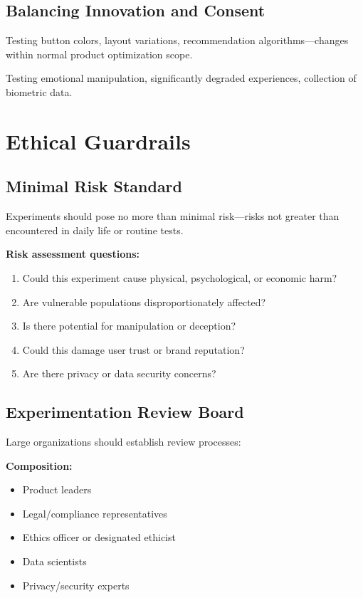 \subsection{Balancing Innovation and Consent}

\begin{example}
Testing button colors, layout variations, recommendation algorithms—changes within normal product optimization scope.
\end{example}

\begin{example}
Testing emotional manipulation, significantly degraded experiences, collection of biometric data.
\end{example}

\section{Ethical Guardrails}

\subsection{Minimal Risk Standard}

Experiments should pose no more than minimal risk—risks not greater than encountered in daily life or routine tests.

\textbf{Risk assessment questions:}
\begin{enumerate}
    \item Could this experiment cause physical, psychological, or economic harm?
    \item Are vulnerable populations disproportionately affected?
    \item Is there potential for manipulation or deception?
    \item Could this damage user trust or brand reputation?
    \item Are there privacy or data security concerns?
\end{enumerate}

\subsection{Experimentation Review Board}

Large organizations should establish review processes:

\textbf{Composition:}
\begin{itemize}
    \item Product leaders
    \item Legal/compliance representatives
    \item Ethics officer or designated ethicist
    \item Data scientists
    \item Privacy/security experts
\end{itemize}

